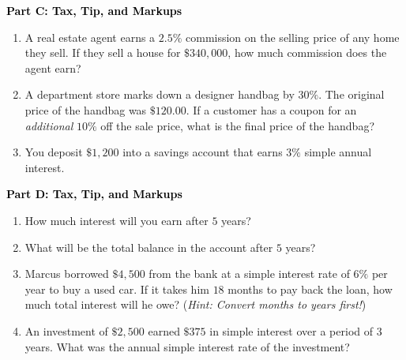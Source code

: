 \documentclass[12pt, letterpaper, fleqn]{article}
\begin{document}
\newpage

\begin{tcolorbox}[colback=customteal!20]
\large\textcolor{black}{\textbf{Part C: Tax, Tip, and Markups}}
\end{tcolorbox}

\vspace{3mm}

\begin{enumerate}[itemsep=4.2cm, leftmargin=0.6cm, resume]
\begin{itemize}
\item What is the sale price of the laptop before tax?
\end{itemize}
\item A real estate agent earns a $2.5\%$ commission on the selling price of any home they sell. If they sell a house for $\$340,000$, how much commission does the agent earn?
\item A department store marks down a designer handbag by $30\%$. The original price of the handbag was $\$120.00$. If a customer has a coupon for an \textit{additional} $10\%$ off the sale price, what is the final price of the handbag?
\item You deposit $\$1,200$ into a savings account that earns $3\%$ simple annual interest. 
\end{enumerate}

\newpage

\begin{tcolorbox}[colback=customteal!20]
\large\textcolor{black}{\textbf{Part D: Tax, Tip, and Markups}}
\end{tcolorbox}

\vspace{3mm}

\begin{enumerate}[itemsep=4.2cm, leftmargin=0.6cm, resume]
\item How much interest will you earn after $5$ years?
\item What will be the total balance in the account after $5$ years?
\item Marcus borrowed $\$4,500$ from the bank at a simple interest rate of $6\%$ per year to buy a used car. If it takes him $18$ months to pay back the loan, how much total interest will he owe? (\textit{Hint: Convert months to years first!})
\item An investment of $\$2,500$ earned $\$375$ in simple interest over a period of $3$ years. What was the annual simple interest rate of the investment?
\end{enumerate}
\end{document}
